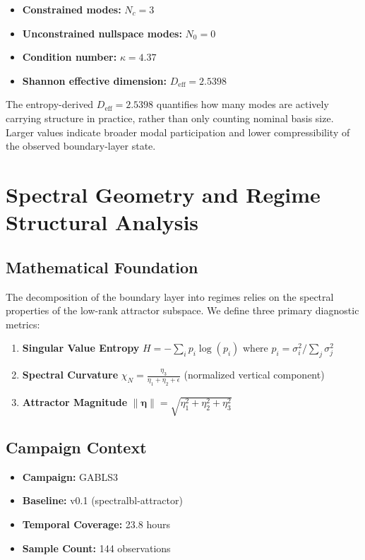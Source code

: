 \documentclass[11pt,a4paper]{article}
\begin{document}
\begin{itemize}
    \item \textbf{Constrained modes:} $N_c = 3$
    \item \textbf{Unconstrained nullspace modes:} $N_0 = 0$
    \item \textbf{Condition number:} $\kappa = 4.37$
    \item \textbf{Shannon effective dimension:} $D_{\text{eff}} = 2.5398$
\end{itemize}

The entropy-derived $D_{\text{eff}} = 2.5398$ quantifies how many modes are actively carrying structure in practice, rather than only counting nominal basis size. Larger values indicate broader modal participation and lower compressibility of the observed boundary-layer state.

\label{sec:attractor_GABLS3} 
\newpage



\section{Spectral Geometry and Regime Structural Analysis}

\subsection{Mathematical Foundation}

The decomposition of the boundary layer into regimes relies on the spectral properties of the low-rank attractor subspace. We define three primary diagnostic metrics:

\begin{enumerate}
    \item \textbf{Singular Value Entropy} $H = -\sum_i p_i \log(p_i)$ where $p_i = \sigma_i^2 / \sum_j \sigma_j^2$
    \item \textbf{Spectral Curvature} $\chi_N = \frac{\eta_3}{\eta_1 + \eta_2 + \epsilon}$ (normalized vertical component)
    \item \textbf{Attractor Magnitude} $\|\boldsymbol{\eta}\| = \sqrt{\eta_1^2 + \eta_2^2 + \eta_3^2}$
\end{enumerate}

\subsection{Campaign Context}

\begin{itemize}
    \item \textbf{Campaign:} GABLS3
    \item \textbf{Baseline:} v0.1 (spectralbl-attractor)
    \item \textbf{Temporal Coverage:} 23.8 hours
    \item \textbf{Sample Count:} 144 observations
\end{itemize}
\end{document}
